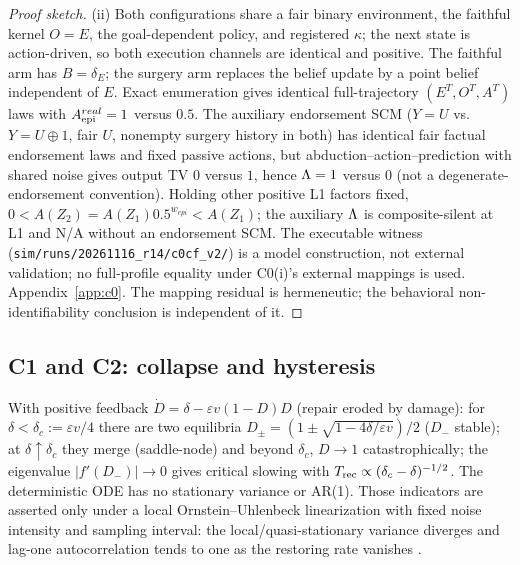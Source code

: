 \begin{proof}[Proof sketch]
(ii) Both configurations share a fair binary environment, the faithful kernel
$O=E$, the goal-dependent policy, and registered $\kappa$; the next state is
action-driven, so both execution channels are identical and positive. The
faithful arm has $B=\delta_E$; the surgery arm replaces the belief update by a
point belief independent of $E$. Exact enumeration gives identical
full-trajectory $(E^T,O^T,A^T)$ laws with $A_{\mathrm{epi}}^{real}=1$ versus $0.5$. The
auxiliary endorsement SCM ($Y=U$ vs.\ $Y=U\oplus1$, fair $U$, nonempty surgery
history in both) has identical fair factual endorsement laws and fixed passive
actions, but abduction--action--prediction with shared noise gives output TV
$0$ versus $1$, hence $\Lambda=1$ versus $0$ (not a degenerate-endorsement
convention). Holding other positive L1 factors fixed,
$0<A(Z_2)=A(Z_1)0.5^{w_{epi}}<A(Z_1)$; the auxiliary $\Lambda$ is composite-silent
at L1 and N/A without an endorsement SCM. The executable witness
(\texttt{sim/runs/20261116\_r14/c0cf\_v2/}) is a model construction, not
external validation; no full-profile equality under C0(i)'s external mappings
is used. Appendix~\ref{app:c0}. The mapping residual is hermeneutic; the
behavioral non-identifiability conclusion is independent of it.
\end{proof}

\subsection{C1 and C2: collapse and hysteresis}\label{sec:c1c2}

\begin{proposition}\label{prop:c1}
With positive feedback $\dot D=\delta-\varepsilon v(1-D)D$ (repair eroded by
damage): for $\delta<\delta_c:=\varepsilon v/4$ there are two equilibria
$D_\pm=(1\pm\sqrt{1-4\delta/\varepsilon v})/2$ ($D_-$ stable); at
$\delta\uparrow\delta_c$ they merge (saddle-node) and beyond $\delta_c$,
$D\to1$ catastrophically; the eigenvalue $|f'(D_-)|\to0$ gives critical
slowing with $T_{\mathrm{rec}}\propto(\delta_c-\delta)^{-1/2}$. The deterministic ODE has
no stationary variance or AR(1). Those indicators are asserted only under a
local Ornstein--Uhlenbeck linearization with fixed noise intensity and sampling
interval: the local/quasi-stationary variance diverges and lag-one
autocorrelation tends to one as the restoring rate vanishes
\citep{lade_gross2012}.
\end{proposition}

